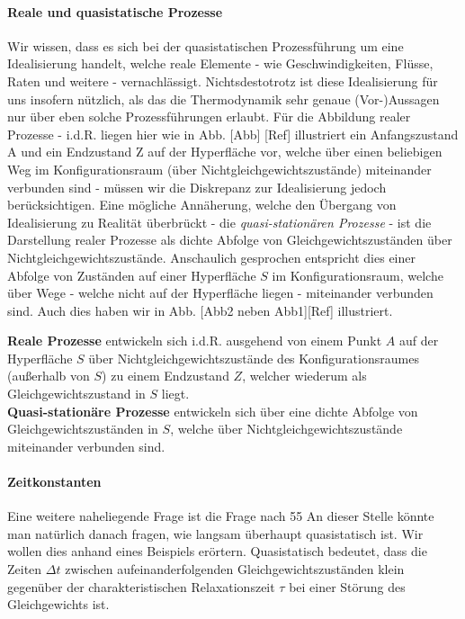 \paragraph*{Reale und quasistatische Prozesse}
Wir wissen, dass es sich bei der quasistatischen Prozessführung um eine Idealisierung handelt, welche reale Elemente - wie Geschwindigkeiten, Flüsse, Raten und weitere - vernachlässigt. 
Nichtsdestotrotz ist diese Idealisierung für uns insofern nützlich, als das die Thermodynamik sehr genaue (Vor-)Aussagen nur über eben solche Prozessführungen erlaubt.
Für die Abbildung realer Prozesse - i.d.R. liegen hier wie in Abb. [Abb] [Ref] illustriert ein Anfangszustand A und ein Endzustand Z auf der Hyperfläche vor, welche über einen beliebigen Weg im Konfigurationsraum (über Nichtgleichgewichtszustände) miteinander verbunden sind - müssen wir die Diskrepanz zur Idealisierung jedoch berücksichtigen. 
Eine mögliche Annäherung, welche den Übergang von Idealisierung zu Realität überbrückt - die \emph{quasi-stationären Prozesse} - ist die Darstellung realer Prozesse als dichte Abfolge von Gleichgewichtszuständen über Nichtgleichgewichtszustände. Anschaulich gesprochen entspricht dies einer Abfolge von Zuständen auf einer Hyperfläche $S$ im Konfigurationsraum, welche über Wege - welche nicht auf der Hyperfläche liegen - miteinander verbunden sind. Auch dies haben wir in Abb. [Abb2 neben Abb1][Ref] illustriert.    
\begin{formal}
     \textbf{Reale Prozesse} entwickeln sich i.d.R. ausgehend von einem Punkt $A$ auf der Hyperfläche $S$ über Nichtgleichgewichtszustände des Konfigurationsraumes (außerhalb von $S$) zu einem Endzustand $Z$, welcher wiederum als Gleichgewichtszustand in $S$ liegt.\\
     \textbf{Quasi-stationäre Prozesse} entwickeln sich über eine dichte Abfolge von Gleichgewichtszuständen in $S$, welche über Nichtgleichgewichtszustände miteinander verbunden sind.
 \end{formal}

\paragraph*{Zeitkonstanten}
Eine weitere naheliegende Frage ist die Frage nach 55
An dieser Stelle könnte man natürlich danach fragen, wie langsam überhaupt quasistatisch ist. 
Wir wollen dies anhand eines Beispiels erörtern. 
Quasistatisch bedeutet, dass die Zeiten $\Delta t$ zwischen aufeinanderfolgenden Gleichgewichtszuständen klein gegenüber der charakteristischen Relaxationszeit $\tau$ bei einer Störung des Gleichgewichts ist. 

